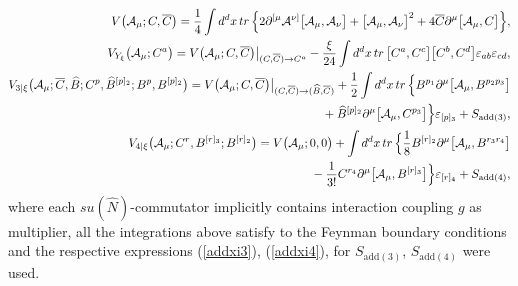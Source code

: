 \documentclass[10pt]{article}
\begin{document}
\begin{eqnarray}
&\hspace{-0.5em}& \hspace{-0.5em}  V\big(\mathcal{A}_\mu; {C}, \overline{C} \big) = \frac{1}{4} \int d^dx \, tr\, \Big\{ 2 \partial^{[\mu}\mathcal{A}^{\nu]}\big[\mathcal{A}_{\mu},\mathcal{A}_{\nu}\big] + \big[\mathcal{A}_{\mu},\mathcal{A}_{\nu}\big]^2 + 4 \overline{C}\partial^{\mu}\big[\mathcal{A}_{\mu}, C\big]\Big\}
,\label{Vps1}\\
&\hspace{-0.5em}& \hspace{-0.5em}   V_{Y_\xi}\big(\mathcal{A}_\mu; {C}^a \big)  =V\big(\mathcal{A}_\mu; {C}, \overline{C} \big)\big|_{({C}, \overline{C})\to C^a} -\frac{\xi }{ 24}  \int d^dx \, tr\,   \big[C^{a},%
C^{c}\big]\big[C^{b},C^{d}\big]\varepsilon_{ab}\varepsilon_{cd} , \label{Vps2} \\
&\hspace{-0.5em}& \hspace{-0.5em}   V_{3|{\xi}}\big(\mathcal{A}_\mu; \overline{C}, \widehat{B}; C^p, \widehat{B}^{[p]_2}; B^p, {B}^{[p]_2} \big) = V\big(\mathcal{A}_\mu; {C}, \overline{C} \big)\big|_{({C}, \overline{C})\to (\widehat{B}, \overline{C})} + \frac{1}{2} \int d^dx \, tr\, \Big\{ B^{p_1}\partial^{\mu}\big[\mathcal{A}_{\mu}, B^{p_2p_3}\big]  \nonumber \\
&\hspace{-0.5em}& \hspace{-0.5em} \phantom{V_{3|{\xi}}\big(\mathcal{A}_\mu; \overline{C}, \widehat{B}; C^p, \widehat{B}^{[p]_2}; B^p, {B}^{[p]_2} \big) =}+ \widehat{B}^{[p]_2}\partial^{\mu}\big[\mathcal{A}_{\mu}, C^{p_3}\big] \Big\}\varepsilon_{[p]_3} +  S_{\mathrm{add}(3)} ,\label{Vps3}\\
&\hspace{-0.5em}& \hspace{-0.5em}  \label{Vps4} V_{4|{\xi}}\big(\mathcal{A}_\mu; C^r, {B}^{[r]_3}; {B}^{[r]_2} \big)= V\big(\mathcal{A}_\mu; 0, 0 \big)+ \int d^dx \, tr\, \Big\{\frac{1}{8}{B}^{[r]_2}\partial^{\mu}\big[\mathcal{A}_{\mu}, B^{r_3r_4}\big] \nonumber \\
&\hspace{-0.5em}& \hspace{-0.5em}\phantom{V_{4|{\xi}}\big(\mathcal{A}_\mu; C^r, {B}^{[r]_3}; {B}^{[r]_2} \big)=} -\frac{1}{3!} C^{r_4}\partial^{\mu}\big[\mathcal{A}_{\mu}, B^{[r]_3}\big]   \Big\}\varepsilon_{[r]_4}+ S_{\mathrm{add}(4)},
 \end{eqnarray}
where each $su(\hat{N})$-commutator implicitly  contains interaction coupling $g$ as multiplier, all the integrations above satisfy to the Feynman boundary conditions  and the respective expressions (\ref{addxi3}), (\ref{addxi4}),   for $S_{\mathrm{add}(3)}$, $S_{\mathrm{add}(4)}$  were used.
\end{document}
